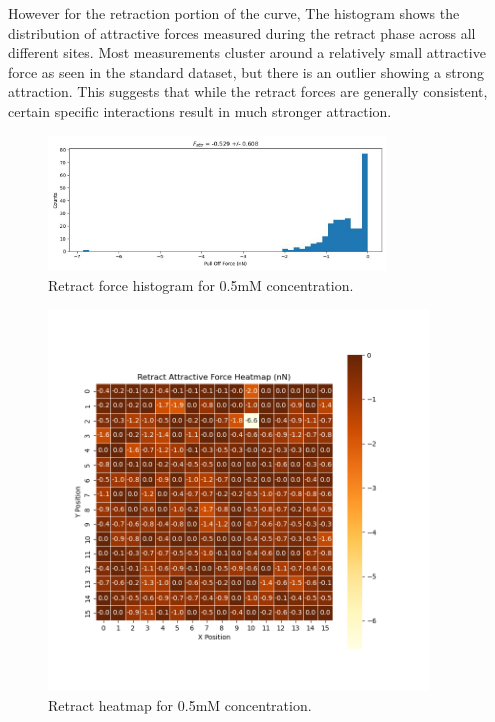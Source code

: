 However for the retraction portion of the curve, The histogram shows the distribution of attractive forces measured during the retract phase across all different sites. Most measurements cluster around a relatively small attractive force as seen in the standard dataset, but there is an outlier showing a strong attraction. This suggests that while the retract forces are generally consistent, certain specific interactions result in much stronger attraction. 

\begin{figure}[h!!!]
    \centering
    \includegraphics[width=0.8\textwidth]{chapter7/ForceMaps/0.5mM/retract_f_a_hist.jpg}
    \caption{Retract force histogram for 0.5mM concentration.}
    \label{fig:retract_f_a_hist_0.5mM}
\end{figure}

\begin{figure}[h!!!]
    \centering
    \includegraphics[width=0.9\textwidth]{chapter7/ForceMaps/0.5mM/Retract heatmap.png}
    \caption{Retract heatmap for 0.5mM concentration.}
    \label{fig:retract_heatmap_0.5mM}
\end{figure}

